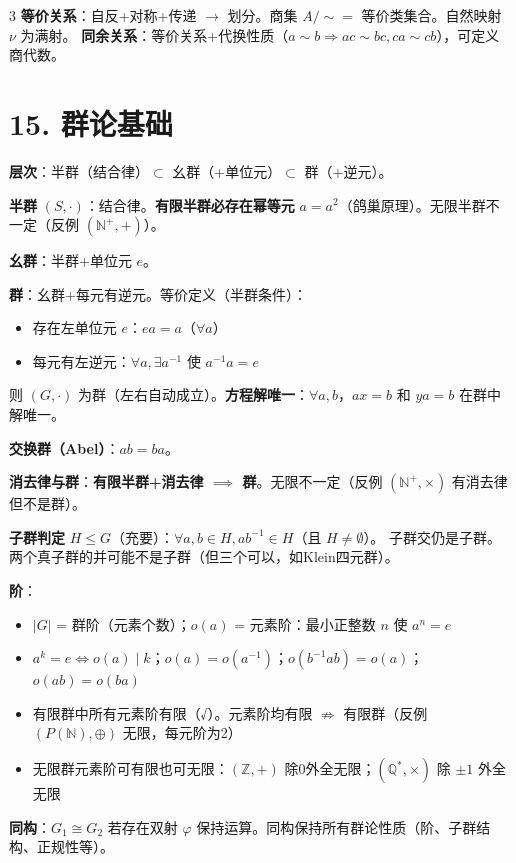 \documentclass[10pt,a4paper,landscape]{ctexart}
\begin{document}
\begin{multicols}{3}
\textbf{等价关系}：自反+对称+传递 $\to$ 划分。商集 $A/{\sim}=$ 等价类集合。自然映射 $\nu$ 为满射。
\textbf{同余关系}：等价关系+代换性质（$a\sim b\Rightarrow ac\sim bc,ca\sim cb$），可定义商代数。

\section*{15. 群论基础}

\textbf{层次}：半群（结合律）$\subset$ 幺群（+单位元）$\subset$ 群（+逆元）。

\textbf{半群} $(S,\cdot)$：结合律。\textbf{有限半群必存在幂等元} $a=a^2$（鸽巢原理）。无限半群不一定（反例 $(\mathbb{N}^+,+)$）。

\textbf{幺群}：半群+单位元 $e$。

\textbf{群}：幺群+每元有逆元。等价定义（半群条件）：
\begin{itemize}
\item 存在左单位元 $e$：$ea=a$（$\forall a$）
\item 每元有左逆元：$\forall a,\exists a^{-1}$ 使 $a^{-1}a=e$
\end{itemize}
则 $(G,\cdot)$ 为群（左右自动成立）。\textbf{方程解唯一}：$\forall a,b$，$ax=b$ 和 $ya=b$ 在群中解唯一。

\textbf{交换群（Abel）}：$ab=ba$。

\textbf{消去律与群}：\textbf{有限半群+消去律 $\implies$ 群}。无限不一定（反例 $(\mathbb{N}^+,\times)$ 有消去律但不是群）。

\textbf{子群判定} $H\leq G$（充要）：$\forall a,b\in H,ab^{-1}\in H$（且 $H\neq\emptyset$）。
子群交仍是子群。两个真子群的并可能不是子群（但三个可以，如Klein四元群）。

\textbf{阶}：
\begin{itemize}
\item $|G|$ = 群阶（元素个数）；$o(a)$ = 元素阶：最小正整数 $n$ 使 $a^n=e$
\item $a^k=e\iff o(a)\mid k$；$o(a)=o(a^{-1})$；$o(b^{-1}ab)=o(a)$；$o(ab)=o(ba)$
\item 有限群中所有元素阶有限（√）。元素阶均有限 $\not\Rightarrow$ 有限群（反例 $(P(\mathbb{N}),\oplus)$ 无限，每元阶为2）
\item 无限群元素阶可有限也可无限：$(\mathbb{Z},+)$ 除0外全无限；$(\mathbb{Q}^*,\times)$ 除 $\pm1$ 外全无限
\end{itemize}

\textbf{同构}：$G_1\cong G_2$ 若存在双射 $\varphi$ 保持运算。同构保持所有群论性质（阶、子群结构、正规性等）。


\end{multicols}
\end{document}
